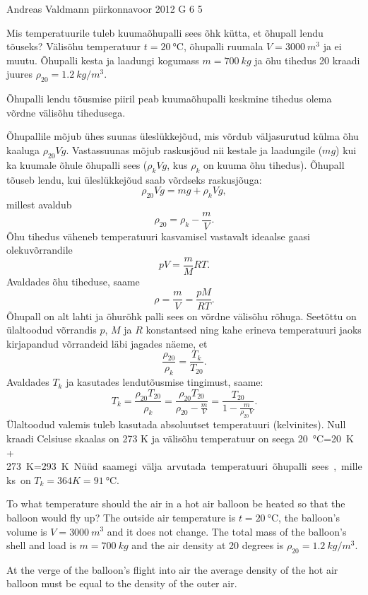 {Andreas Valdmann} %
{piirkonnavoor} %
{2012} %
{G 6} %
{5} %
{
\ifStatement
Mis temperatuurile tuleb kuumaõhupalli sees õhk kütta, et õhupall lendu tõuseks?
Välisõhu temperatuur $t=\SI{20}{\celsius}$, õhupalli ruumala $V=\SI{3000}{m^3}$ ja ei
muutu. Õhupalli kesta ja laadungi kogumass $m=\SI{700}{kg}$ ja õhu tihedus
20 kraadi juures $\rho_{20}=\SI{1,2}{kg/m^3}$.
\fi


\ifHint
Õhupalli lendu tõusmise piiril peab kuumaõhupalli keskmine tihedus olema võrdne välisõhu tihedusega.
\fi


\ifSolution
Õhupallile mõjub ühes suunas üleslükkejõud, mis võrdub väljasurutud külma õhu 
kaaluga $\rho_{20} V g$. Vastassuunas mõjub raskusjõud nii kestale ja laadungile ($mg$) kui ka kuumale õhule õhupalli sees ($\rho_k V g$, kus $\rho_k$ on kuuma õhu tihedus). Õhupall tõuseb lendu, kui üleslükkejõud saab võrdseks raskusjõuga:
\[ \rho_{20} V g=mg+\rho_k V g,\]
millest avaldub
\[ \rho_{20}=\rho_k-\frac{m}{V}.\]
Õhu tihedus väheneb temperatuuri kasvamisel vastavalt ideaalse gaasi olekuvõrrandile
\[ pV=\frac{m}{M}RT. \]
Avaldades õhu tiheduse, saame
\[ \rho=\frac{m}{V}=\frac{pM}{RT}.\]
Õhupall on alt lahti ja õhurõhk palli sees on võrdne välisõhu rõhuga. Seetõttu on ülaltoodud võrrandis $p$, $M$ ja $R$ konstantsed ning kahe erineva temperatuuri jaoks kirjapandud võrrandeid läbi jagades näeme, et
\[ \frac{\rho_{20}}{\rho_k}=\frac{T_k}{T_{20}}.\]
Avaldades $T_k$ ja kasutades lendutõusmise tingimust, saame:
\[ T_k=\frac{\rho_{20} T_{20}}{\rho_k}=\frac{\rho_{20} 
T_{20}}{\rho_{20}-\frac{m}{V}}=\frac{T_{20}}{1-\frac{m}{\rho_{20}V}}.\]
Ülaltoodud valemis tuleb kasutada absoluutset temperatuuri (kelvinites). Null 
kraadi Celsiuse skaalas on 273 K ja välisõhu temperatuur on seega 
\SI{20}{\celsius}=\SI{20}{K} + \SI{273}{K}=\SI{293}K. Nüüd saamegi välja arvutada temperatuuri õhupalli sees, milleks on $T_k=\SI{364}K=\SI{91}\celsius$.
\fi


\ifEngStatement
To what temperature should the air in a hot air balloon be heated so that the balloon would fly up? The outside air temperature is $t=\SI{20}{\celsius}$, the balloon's volume is $V=\SI{3000}{m^3}$ and it does not change. The total mass of the balloon's shell and load is $m=\SI{700}{kg}$ and the air density at 20 degrees is $\rho_{20}=\SI{1,2}{kg/m^3}$.
\fi


\ifEngHint
At the verge of the balloon's flight into air the average density of the hot air balloon must be equal to the density of the outer air.
\fi


}

